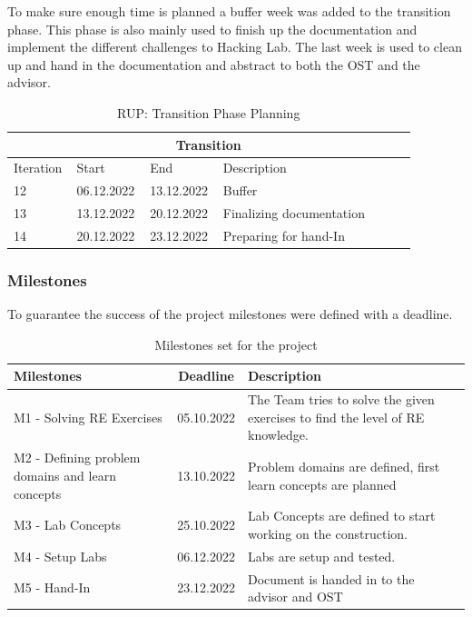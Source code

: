 \noindent To make sure enough time is planned a buffer week was added to the transition phase. This phase is also mainly used to finish up the documentation and implement the different challenges to Hacking Lab. The last week is used to clean up and hand in the documentation and abstract to both the OST and the advisor.
\begin{table}[H]
    \centering
    \begin{tabular}{|p{0.12\linewidth}|p{0.15\linewidth}|p{0.15\linewidth}|p{0.46\linewidth}|}
        \hline
        \multicolumn{4}{||c||}{\textbf{Transition}} \\
        \hline \hline
        Iteration & Start & End & Description \\
        \hline \hline
        12 & 06.12.2022 & 13.12.2022 & Buffer \\
        \hline
        13 & 13.12.2022 & 20.12.2022 & Finalizing documentation \\
        \hline
        14 & 20.12.2022 & 23.12.2022 & Preparing for hand-In \\
        \hline
    \end{tabular}
    \caption{RUP: Transition Phase Planning}
    \label{transition_table}
\end{table}

\subsubsection*{Milestones}
To guarantee the success of the project milestones were defined with a deadline.

\begin{table}[H]
    \centering
    \begin{tabular}[]{|| p{5cm} | c | p{6.2cm} ||}
        \hline
        Milestones & Deadline & Description \\
        \hline \hline
        M1 - Solving RE Exercises & 05.10.2022 & The Team tries to solve the given exercises to find the level of RE knowledge. \\
        \hline
        M2 - Defining problem domains and learn concepts& 13.10.2022 & Problem domains are defined, first learn concepts are planned \\
        \hline
        M3 - Lab Concepts & 25.10.2022 & Lab Concepts are defined to start working on the construction. \\
        \hline
        M4 - Setup Labs & 06.12.2022 & Labs are setup and tested. \\
        \hline
        M5 - Hand-In & 23.12.2022 & Document is handed in to the advisor and OST \\
        \hline
    \end{tabular}
    \caption{Milestones set for the project}
    \label{milestones_table}
\end{table}

